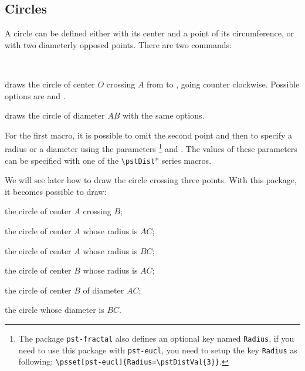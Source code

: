 \documentclass[11pt,english,BCOR=10mm,DIV=12,bibliography=totoc,parskip=false,headings=small,
    headinclude=false,footinclude=false,twoside,english]{pst-doc}
\begin{document}
\subsection{Circles}

A circle can be defined either with its center and a point of its
circumference, or with two diameterly opposed points. There are two
commands:

\begin{BDef}
\OptArgs{}\\
\OptArgs{}
\end{BDef}

 draws the circle of center $O$ crossing $A$ from  to ,
going counter clockwise. Possible options are  and .

 draws the circle of diameter $AB$ with the same options.

For the first macro, it is possible to omit the second point and then
to specify a radius or a diameter using the parameters 
\footnote{The package \texttt{pst-fractal} also defines an optional key
named \texttt{Radius}, if you need to use this package with \texttt{pst-eucl},
you need to setup the key \texttt{Radius} as following:
\texttt{\textbackslash{}psset[pst-eucl]\{Radius=\textbackslash{}pstDistVal\{3\}\}}.}
and . The values of these parameters can be specified
with one of the \verb|\pstDist|* series macros.

We will see later how to draw the circle crossing three points.
With this package, it becomes possible to draw:
\begin{compactitem}
\item {\color{red} the circle of center $A$ crossing $B$;}
\item {\color{green} the circle of center $A$ whose radius is $AC$;}
\item {\color{blue} the circle of center $A$ whose radius is $BC$;}
\item {\color{Sepia} the circle of center $B$ whose radius is $AC$;}
\item {\color{Aquamarine} the circle of center $B$ of diameter $AC$;}
\item {\color{RoyalBlue} the circle whose diameter is $BC$.}
\end{compactitem}
\end{document}
